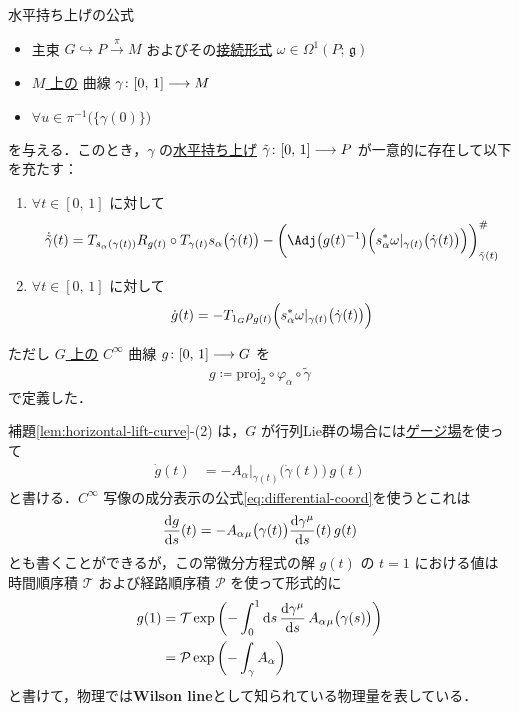 \documentclass[geometry_main]{subfiles}
\begin{document}
\begin{mylem}[label=lem:horizontal-lift-curve]{水平持ち上げの公式}
    \begin{itemize}
        \item 主束 $G \hookrightarrow P \xrightarrow{\pi} M$ およびその\hyperref[def:connection]{接続形式} $\omega \in \Omega^1(P;\, \mathfrak{g})$
        \item \underline{$M$ 上の} \cinfty 曲線 $\gamma \colon [0,\, 1] \longrightarrow M$
        \item $\forall u \in \pi^{-1} \bigl( \{\gamma(0)\} \bigr)$
    \end{itemize}
    を与える．このとき，$\gamma$ の\hyperref[def:horizontal-lift-curve]{水平持ち上げ} $\tilde{\gamma} \colon [0,\, 1] \longrightarrow P$ が一意的に存在して以下を充たす：
    \begin{enumerate}
        \item $\forall t \in [0,\, 1]$ に対して
        \begin{align}
            \dot{\tilde{\gamma}} (t) = T_{s_\alpha(\gamma(t))} R_{g(t)} \circ T_{\gamma(t)}s_\alpha \bigl(\dot{\gamma}(t)\bigr) - \biggl(\Adj \bigl( g(t)^{-1} \bigr) \Bigl( s_\alpha^* \omega|_{\gamma(t)}\bigl(\dot{\gamma}(t)\bigr) \Bigr) \biggr)^\#_{\tilde{\gamma}(t)}
        \end{align}
        \item $\forall t \in [0,\, 1]$ に対して
        \begin{align}
            \dot{g}(t) = -T_{1_G} \rho_{g(t)} \Bigl(s_\alpha^* \omega|_{\gamma(t)} \bigl( \dot{\gamma}(t) \bigr)  \Bigr)
        \end{align}
    \end{enumerate}
    ただし \underline{$G$ 上の} $C^\infty$ 曲線 $g \colon [0,\, 1] \longrightarrow G$ を 
    \begin{align}
        g \coloneqq \mathrm{proj}_2 \circ \varphi_\alpha \circ \tilde{\gamma}
    \end{align}
    で定義した．
\end{mylem}

補題\ref{lem:horizontal-lift-curve}-(2) は，$G$ が行列Lie群の場合には\hyperref[thm:local-connection]{ゲージ場}を使って
\begin{align}
    \dot{g}(t) 
    &= -A_\alpha|_{\gamma(t)} \bigl( \dot{\gamma}(t) \bigr)\, g(t)
\end{align}
と書ける．$C^\infty$ 写像の成分表示の公式\eqref{eq:differential-coord}を使うとこれは
\begin{align}
    \dv{g}{s}()(t) =- A_\alpha{}_\mu \bigl( \gamma(t) \bigr)  \dv{\gamma^\mu}{s}()(t)\, g(t)
\end{align}
とも書くことができるが，この常微分方程式の解 $g(t)$ の $t=1$ における値は時間順序積 $\mathcal{T}$ および経路順序積 $\mathcal{P}$ を使って形式的に
\begin{align}
    g(1) 
    &= \mathcal{T} \exp \left( - \int_0^1 \dd{s} \dv{\gamma^\mu}{s}\, A_\alpha{}_\mu \bigl( \gamma(s) \bigr) \right) \\
    &= \mathcal{P} \exp \left( - \int_{\gamma} A_\alpha \right) 
\end{align}
と書けて，物理では\textbf{Wilson line}として知られている物理量を表している．
\end{document}
